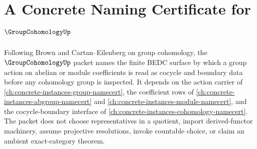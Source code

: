 \chapter{A Concrete Naming Certificate for $\GroupCohomologyUp$}
\label{ch:concrete-instances-group-cohomology-namecert}

Following Brown and Cartan--Eilenberg on group cohomology, the $\GroupCohomologyUp$ packet names the finite BEDC surface by which a group action on abelian or module coefficients is read as cocycle and boundary data before any cohomology group is inspected. It depends on the action carrier of \autoref{ch:concrete-instances-group-namecert}, the coefficient rows of \autoref{ch:concrete-instances-abgroup-namecert} and \autoref{ch:concrete-instances-module-namecert}, and the cocycle-boundary interface of \autoref{ch:concrete-instances-cohomology-namecert}. The packet does not choose representatives in a quotient, import derived-functor machinery, assume projective resolutions, invoke countable choice, or claim an ambient exact-category theorem.

